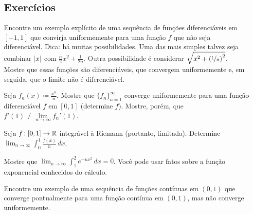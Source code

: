 \subsection{Exercícios}

\begin{exercise}
Encontre um exemplo explícito de uma sequência de funções diferenciáveis
em $[-1,1]$ que convirja uniformemente para uma função $f$ que não seja
diferenciável.
Dica: há muitas possibilidades. Uma das mais simples talvez seja combinar
$\lvert {x} \rvert$ com $\frac{n}{2}x^2 + \frac{1}{2n}$.
Outra possibilidade é considerar $\sqrt{x^2+{(\nicefrac{1}{n})}^2}$.
Mostre que essas funções são diferenciáveis, que convergem uniformemente e,
em seguida, que o limite não é diferenciável.
\end{exercise}

\begin{exercise}
Seja $f_n(x) \coloneqq \frac{x^n}{n}$. Mostre que
$\{ f_n \}_{n=1}^\infty$ converge uniformemente para uma função
diferenciável $f$ em $[0,1]$ (determine $f$). Mostre, porém, que
$f'(1) \neq \lim\limits_{n\to\infty} f_n'(1)$.
\end{exercise}

%
\begin{exercise}
Seja $f \colon [0,1] \to {\mathbb{R}}$ integrável à Riemann (portanto, limitada).
Determine $\displaystyle \lim_{n\to\infty} \int_0^1 \frac{f(x)}{n} \,dx$.
\end{exercise}

\begin{exercise}
Mostre que
$\displaystyle \lim_{n\to\infty} \int_1^2 e^{-nx^2} \,dx = 0$. Você pode
usar fatos sobre a função exponencial conhecidos do cálculo.
\end{exercise}

\begin{exercise}
Encontre um exemplo de uma sequência de funções contínuas em $(0,1)$ que
converge pontualmente para uma função contínua em $(0,1)$, mas não converge
uniformemente.
\end{exercise}

